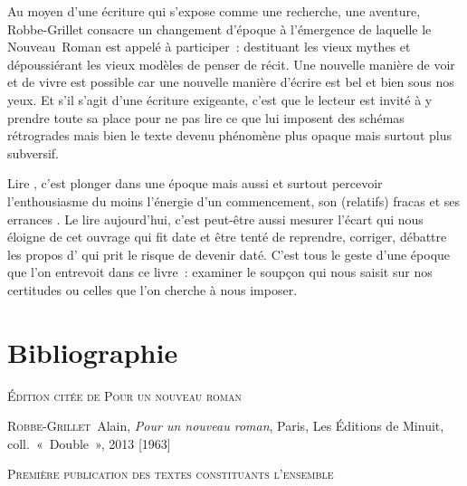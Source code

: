 \documentclass[12pt, a4paper]{article}
\begin{document}
Au moyen d'une écriture qui s'expose comme une recherche, une aventure, Robbe-Grillet consacre un changement d'époque à l'émergence de laquelle le Nouveau~Roman est appelé à participer~: destituant les vieux mythes et dépoussiérant les vieux modèles de penser de récit. Une nouvelle manière de voir et de vivre est possible car une nouvelle manière d'écrire est bel et bien sous nos yeux. Et s'il s'agit d'une écriture exigeante, c'est que le lecteur est invité à y prendre toute sa place pour ne pas lire ce que lui imposent des schémas rétrogrades mais bien le texte devenu phénomène plus opaque mais surtout plus subversif.

Lire \punr, c'est plonger dans une époque mais aussi et surtout percevoir l'enthousiasme du moins l'énergie d'un commencement, son (relatifs) fracas et ses errances %
. Le lire aujourd'hui, c'est peut-être aussi mesurer l'écart qui nous éloigne de cet ouvrage qui fit date et être tenté de reprendre, corriger, débattre les propos d'\robbe{} qui prit le risque de devenir daté. C'est tous le geste d'une époque que l'on entrevoit dans ce livre~: examiner le soupçon qui nous saisit sur nos certitudes ou celles que l'on cherche à nous imposer.




\newpage
\section{Bibliographie}
    
        
        \vspace*{2cm}
        \setlength{\parindent}{0cm}
{\large\textsc{Édition citée de Pour un nouveau roman}}
        \vspace*{1cm}
        \setlength{\parindent}{25pt}
        
        
        

        
        \textsc{Robbe-Grillet}~Alain, \textit{Pour un nouveau roman}, Paris, Les Éditions de Minuit, coll.~«~Double~», 2013 [1963]\par 
    
        \vspace*{2cm}
        \setlength{\parindent}{0cm}
{\large\textsc{Première publication des textes constituants l'ensemble}}
        \vspace*{1cm}
        \setlength{\parindent}{25pt}
        
        
        
\end{document}
